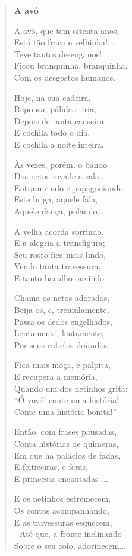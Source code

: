 \begin{verse}
\textbf{A avó}

A avó, que tem oitenta anos,\\
Está tão fraca e velhinha!...\\
Teve tantos desenganos!\\
Ficou branquinha, branquinha,\\
Com os desgostos humanos.


Hoje, na sua cadeira,\\
Repousa, pálida e fria,\\
Depois de tanta canseira:\\
E cochila todo o dia,\\
E cochila a noite inteira.


Às vezes, porém, o bando\\
Dos netos invade a sala...\\
Entram rindo e papagueiando:\\
Este briga, aquele fala,\\
Aquele dança, pulando...


A velha acorda sorrindo.\\
E a alegria a transfigura;\\
Seu rosto fica mais lindo,\\
Vendo tanta travessura,\\
E tanto barulho ouvindo.


Chama os netos adorados,\\
Beija-os, e, tremulamente,\\
Passa os dedos engelhados,\\
Lentamente, lentamente,\\
Por seus cabelos doirados.


Fica mais moça, e palpita,\\
E recupera a memória,\\
Quando um dos netinhos grita:\\
“Ó vovó! conte uma história!\\
Conte uma história bonita!”


Então, com frases pausadas,\\
Conta histórias de quimeras,\\
Em que há palácios de fadas,\\
E feiticeiras, e feras,\\
E princesas encantadas ...

\enlargethispage{2\baselineskip}
E os netinhos estremecem,\\
Os contos acompanhando,\\
E as travessuras esquecem,\\
- Até que, a fronte inclinando\\
Sobre o seu colo, adormecem...
\end{verse}

